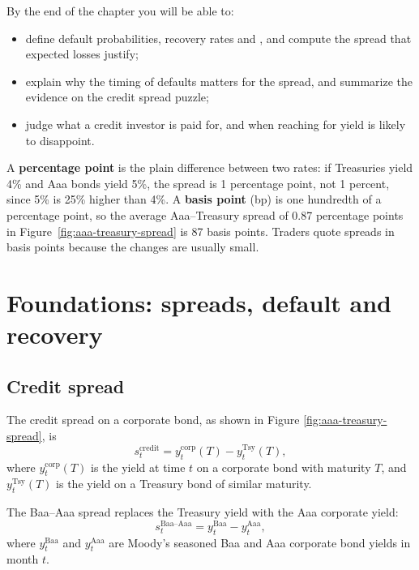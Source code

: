 By the end of the chapter you will be able to:

\begin{itemize}
  \item define default probabilities, recovery rates and , and compute the spread that expected losses justify;
  \item explain why the timing of defaults matters for the spread, and summarize the evidence on the credit spread puzzle;
  \item judge what a credit investor is paid for, and when reaching for yield is likely to disappoint.
\end{itemize}

\begin{callout}{}

A \textbf{percentage point} is the plain difference between two rates: if Treasuries yield 4\% and Aaa bonds yield 5\%, the spread is 1 percentage point, not 1 percent, since 5\% is 25\% higher than 4\%. A \textbf{basis point} (bp) is one hundredth of a percentage point, so the average Aaa--Treasury spread of 0.87 percentage points in Figure~\ref{fig:aaa-treasury-spread} is 87 basis points. Traders quote spreads in basis points because the changes are usually small.
\end{callout}

\section{Foundations: spreads, default and recovery}
\label{sec:15-foundations}

\subsection{Credit spread}

The credit spread on a corporate bond, as shown in Figure \ref{fig:aaa-treasury-spread}, is
\begin{equation}
  s_t^{\text{credit}} = y_t^{\text{corp}}(T) - y_t^{\text{Tsy}}(T),
  \label{eq:credit-spread}
\end{equation}
where $y_t^{\text{corp}}(T)$ is the yield at time $t$ on a corporate bond with maturity $T$, and $y_t^{\text{Tsy}}(T)$ is the yield on a Treasury bond of similar maturity.

The Baa--Aaa spread replaces the Treasury yield with the Aaa corporate yield:
\begin{equation}
  s_t^{\text{Baa--Aaa}} = y_t^{\text{Baa}} - y_t^{\text{Aaa}},
  \label{eq:baa-aaa-spread}
\end{equation}
where $y_t^{\text{Baa}}$ and $y_t^{\text{Aaa}}$ are Moody's seasoned Baa and Aaa corporate bond yields in month $t$.



